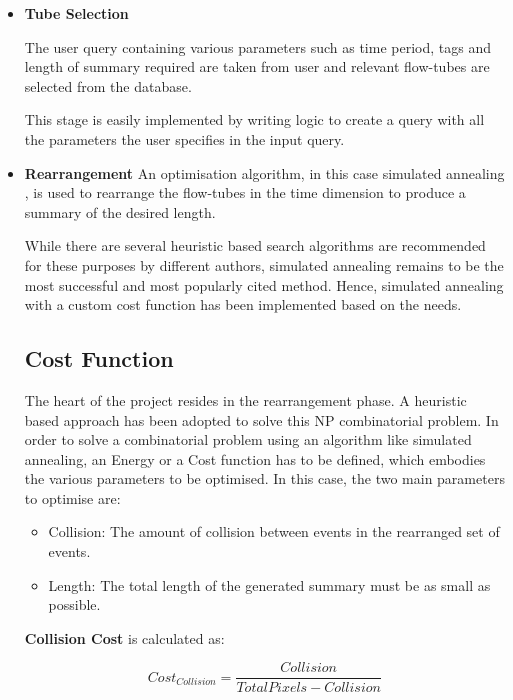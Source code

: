 \documentclass[conference]{IEEEtran}
\begin{document}
\begin{itemize}

    \item \textbf{Tube Selection}

    The user query containing various parameters such as time period, tags and
    length of summary required are taken from user and relevant flow-tubes are
    selected from the database.

    This stage is easily implemented by writing logic to create a query with
    all the parameters the user specifies in the input query.

    \item \textbf{Rearrangement}
    An optimisation algorithm, in this case simulated annealing
    \cite{yao1995new}, is used to rearrange the flow-tubes in the time
    dimension to produce a summary of the desired length.

    While there are several heuristic based search algorithms are recommended
    for these purposes by different authors, simulated annealing remains to be
    the most successful and most popularly cited method. Hence, simulated
    annealing with a custom cost function has been implemented based on the
    needs.

    \subsection{Cost Function}
    The heart of the project resides in the rearrangement phase. A heuristic
    based approach has been adopted to solve this NP combinatorial problem.
    In order to solve a combinatorial problem using an algorithm like simulated
    annealing\cite{yao1995new}, an Energy or a Cost function has to be defined,
    which embodies the various parameters to be optimised. In this case, the
    two main parameters to optimise are:
    \begin{itemize}
        \item Collision: The amount of collision between events in the rearranged
        set of events.
        \item Length: The total length of the generated summary must be as small
        as possible.
    \end{itemize}
    \textbf{Collision Cost} is calculated as:

    \begin{equation}\label{eqn:collcost}
    Cost_{Collision} = \frac{Collision}{TotalPixels - Collision}
    \end{equation}


\end{itemize}
\end{document}
